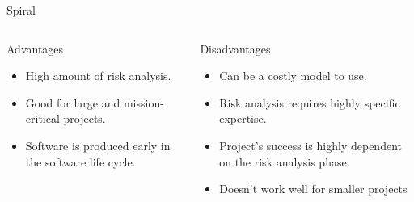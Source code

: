 \documentclass[final,hyperref={pdfpagelabels=false}]{beamer}
\begin{document}
\begin{frame}{Spiral}
    \begin{columns}[t]
      \begin{column}{.48\linewidth}
        \begin{block}{Advantages}
          \begin{itemize}
          \item High amount of risk analysis.
          \item Good for large and mission-critical projects.
          \item Software is produced early in the software life cycle.
          \end{itemize}
        \end{block}
      \end{column}
      \begin{column}{.48\linewidth}
        \begin{block}{Disadvantages}
          \begin{itemize}
          \item Can be a costly model to use.
          \item Risk analysis requires highly specific expertise.
          \item Project's success is highly dependent on the risk
                analysis phase.
          \item Doesn't work well for smaller projects
          \end{itemize}
        \end{block}
      \end{column}
    \end{columns}
  \end{frame}
\end{document}
